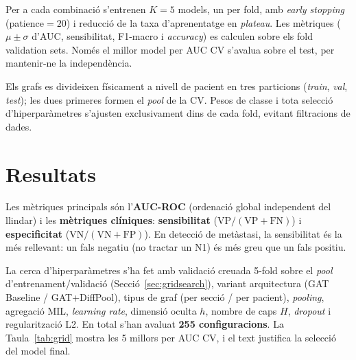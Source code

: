 \documentclass[10pt,a4paper,twocolumn,twoside]{article}
\begin{document}
Per a cada combinació s'entrenen $K\!=\!5$ models, un per fold, amb \textit{early stopping}
(patience$=\!20$) i reducció de la taxa d'aprenentatge en \textit{plateau}. Les mètriques
($\mu \pm \sigma$ d'AUC, sensibilitat, F1-macro i \textit{accuracy}) es calculen sobre els
fold validation sets. Només el millor model per AUC CV s'avalua sobre el test, per mantenir-ne
la independència.

Els grafs es divideixen físicament a nivell de pacient en tres particions (\textit{train},
\textit{val}, \textit{test}); les dues primeres formen el \textit{pool} de la CV. Pesos de
classe i tota selecció d'hiperparàmetres s'ajusten exclusivament dins de cada fold, evitant
filtracions de dades.

\section{Resultats}

Les mètriques principals són l'\textbf{AUC-ROC} (ordenació global independent del llindar)
i les \textbf{mètriques clíniques}: \textbf{sensibilitat} ($\text{VP}/(\text{VP}+\text{FN})$)
i \textbf{especificitat} ($\text{VN}/(\text{VN}+\text{FP})$). En detecció de metàstasi, la
sensibilitat és la més rellevant: un fals negatiu (no tractar un N1) és més greu que un
fals positiu.

La cerca d'hiperparàmetres s'ha fet amb validació creuada 5-fold sobre el \textit{pool}
d'entrenament/validació (Secció~\ref{sec:gridsearch}), variant arquitectura (GAT Baseline /
GAT+DiffPool), tipus de graf (per secció / per pacient), \textit{pooling}, agregació MIL,
\textit{learning rate}, dimensió oculta $h$, nombre de caps $H$, \textit{dropout} i
regularització L2. En total s'han avaluat \textbf{255 configuracions}. La Taula~\ref{tab:grid}
mostra les 5 millors per AUC CV, i el text justifica la selecció del model final.
\end{document}
